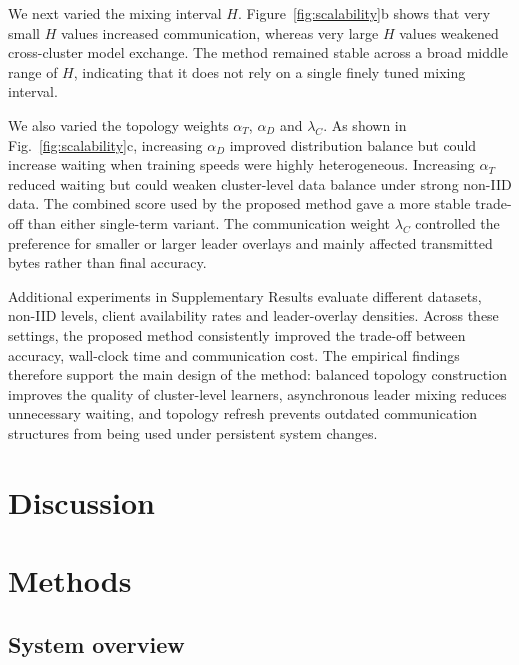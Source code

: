 \documentclass[pdflatex,sn-mathphys-num]{sn-jnl}
\begin{document}
We next varied the mixing interval \(H\). Figure~\ref{fig:scalability}b shows that very small \(H\) values increased communication, whereas very large \(H\) values weakened cross-cluster model exchange. The method remained stable across a broad middle range of \(H\), indicating that it does not rely on a single finely tuned mixing interval.

We also varied the topology weights \(\alpha_T\), \(\alpha_D\) and \(\lambda_C\). As shown in Fig.~\ref{fig:scalability}c, increasing \(\alpha_D\) improved distribution balance but could increase waiting when training speeds were highly heterogeneous. Increasing \(\alpha_T\) reduced waiting but could weaken cluster-level data balance under strong non-IID data. The combined score used by the proposed method gave a more stable trade-off than either single-term variant. The communication weight \(\lambda_C\) controlled the preference for smaller or larger leader overlays and mainly affected transmitted bytes rather than final accuracy.

Additional experiments in Supplementary Results evaluate different datasets, non-IID levels, client availability rates and leader-overlay densities. Across these settings, the proposed method consistently improved the trade-off between accuracy, wall-clock time and communication cost. The empirical findings therefore support the main design of the method: balanced topology construction improves the quality of cluster-level learners, asynchronous leader mixing reduces unnecessary waiting, and topology refresh prevents outdated communication structures from being used under persistent system changes.












\section{Discussion}









\section{Methods}
\label{sec:methods}

\subsection{System overview}
\label{subsec:system_overview}
\end{document}

